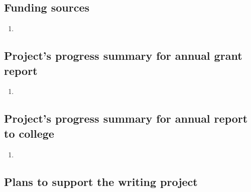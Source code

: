 \documentclass[10pt,letterpaper]{article}
\newcommand{\be}{\begin{enumerate}}
\newcommand{\ee}{\end{enumerate}}
\begin{document}
\subsection*{Funding sources}
% 
\be
\item 
\ee

\subsection*{Project's progress summary for annual grant report}
%
% 
\be
\item 
\ee

\subsection*{Project's progress summary for annual report to college}
% 
\be
\item 
\ee


\subsection*{Plans to support the writing project}

\end{document}
